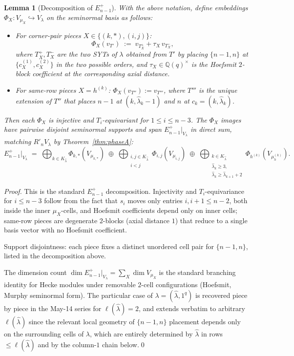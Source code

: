 \documentclass[11pt]{article}
\newtheorem{lemma}[theorem]{Lemma}
\theoremstyle{definition}
\newcommand{\Vlam}{V_\lambda}
\newcommand{\hatl}{\widehat\lambda}
\newcommand{\Rp}{{R'}}
\newcommand{\elh}{\ell(\hatl)}
\begin{document}
\begin{lemma}[Decomposition of $E^+_{n-1}$]\label{lem:Eplus-decomp}
With the above notation, define embeddings $\Phi_X : V_{\mu_X}
\hookrightarrow \Vlam$ on the seminormal basis as follows:
\begin{itemize}[topsep=0.2em,itemsep=0.1em]
\item For corner-pair pieces $X \in \{(k,*), (i,j)\}$:
\[
   \Phi_X(v_{T'}) \;:=\; v_{T_X^+} + \tau_X\, v_{T_X^-},
\]
where $T_X^+, T_X^-$ are the two SYTs of $\lambda$ obtained from $T'$
by placing $\{n-1, n\}$ at $\{c_X^{(1)}, c_X^{(2)}\}$ in the two
possible orders, and $\tau_X \in \mathbb{Q}(q)^\times$ is the Hoefsmit
$2$-block coefficient at the corresponding axial distance.
\item For same-row pieces $X = h^{(k)}$:
$\Phi_X(v_{T''}) := v_{T'''}$, where $T'''$ is the unique extension of
$T''$ that places $n-1$ at $(k, \hatl_k - 1)$ and $n$ at $c_k =
(k, \hatl_k)$.
\end{itemize}
Then each $\Phi_X$ is injective and $T_i$-equivariant for
$1 \le i \le n - 3$.  The $\Phi_X$ images have pairwise disjoint
seminormal supports and span $E_{n-1}^+|_{\Vlam}$ in direct sum,
matching $\Rp_n \Vlam$ by Theorem~\ref{thm:phaseA}:
\[
   E_{n-1}^+|_{\Vlam} \;=\; \bigoplus_{k \in K_{\hatl}}
      \Phi_{k,*}(V_{\mu_{k,*}})
   \;\oplus\; \bigoplus_{\substack{i, j \in K_{\hatl} \\ i < j}}
      \Phi_{i,j}(V_{\mu_{i,j}})
   \;\oplus\; \bigoplus_{\substack{k \in K_{\hatl} \\ \hatl_k \ge 3, \\ \hatl_k \ge \hatl_{k+1}+2}}
      \Phi_{h^{(k)}}(V_{\mu_h^{(k)}}).
\]
\end{lemma}

\begin{proof}
This is the standard $E_{n-1}^+$ decomposition.  Injectivity and
$T_i$-equivariance for $i \le n-3$ follow from the fact that
$s_i$ moves only entries $i, i+1 \le n-2$, both inside the
inner $\mu_X$-cells, and Hoefsmit coefficients depend only on inner
cells; same-row pieces are degenerate $2$-blocks (axial distance $1$)
that reduce to a single basis vector with no Hoefsmit coefficient.

Support disjointness: each piece fixes a distinct unordered cell pair
for $\{n-1, n\}$, listed in the decomposition above.

The dimension count $\dim E_{n-1}^+|_{\Vlam} = \sum_X \dim V_{\mu_X}$
is the standard branching identity for Hecke modules under removable
$2$-cell configurations (Hoefsmit, Murphy seminormal form).  The
particular case of $\lambda = (\hatl, 1^q)$ is recovered piece by
piece in the May-14 series for $\elh = 2$, and extends verbatim to
arbitrary $\elh$ since the relevant local geometry of $\{n-1, n\}$
placement depends only on the surrounding cells of $\lambda$, which
are entirely determined by $\hatl$ in rows $\le \elh$ and by the
column-$1$ chain below.\qed
\end{proof}
\end{document}
